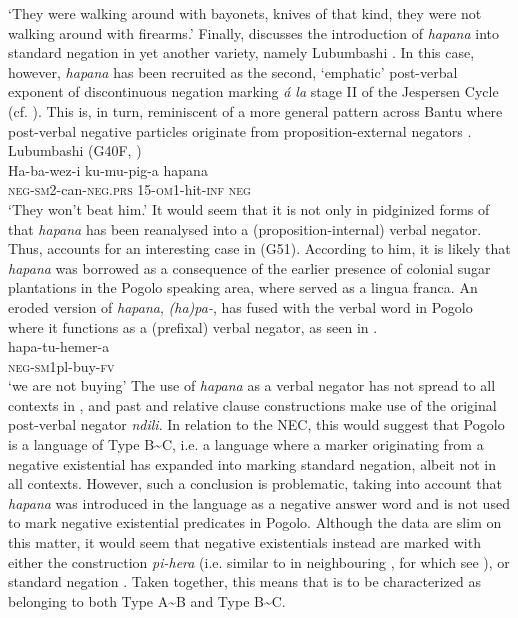 \documentclass[output=paper]{langsci/langscibook}
\begin{document}
\glt 	`They were walking around with bayonets, knives of that kind, they were not walking around with firearms.'
\z
%
Finally, \citet{Schicho1992} discusses the introduction of \textit{hapana}
into standard negation in yet another  variety, namely
Lubumbashi . In this case,
however, \textit{hapana} has been recruited as the second, `emphatic'
post-verbal exponent of discontinuous negation marking \textit{\'a la}
stage II of the Jespersen Cycle (cf. \citealt{Auwera2009}). This is, in
turn, reminiscent of a more general pattern across Bantu where post-verbal
negative particles originate from pro\-po\-si\-tion-ex\-ter\-nal negators
\parencite[see][]{DevosAuwera2013}.
%
\ea\label{ex:lubumbashi-beat}
Lubumbashi  (G40F, \citealt[84]{Schicho1992})\\
\gll Ha-ba-wez-i ku-mu-pig-a hapana\\
	\textsc{neg}-\textsc{sm}2-can-\textsc{neg.prs} 15-\textsc{om}1-hit-\textsc{inf} \textsc{neg}\\
\glt 	`They won't beat him.'
\z
%
It would seem that it is not only in pidginized forms of  that
\textit{hapana} has been reanalysed into a (proposition-internal) verbal
negator. Thus, \citet{Nurse2007} accounts for an interesting case in
 (G51). According to him, it is likely that \textit{hapana} was
borrowed as a consequence of the earlier presence of colonial sugar
plantations in the Pogolo speaking area, where  served as a lingua
franca. An eroded version of \textit{hapana}, \textit{(ha)pa-}, has fused
with the verbal word in Pogolo where it functions as a (prefixal) verbal
negator, as seen in .
%
\ea\label{ex:pogolo-buy}
\\
\gll hapa-tu-hemer-a\\
	\textsc{neg-sm}1pl-buy-\textsc{fv}\\
\glt 	`we are not buying'
\z
%
The use of \textit{hapana} as a verbal negator has not spread to all
contexts in , and past and relative clause constructions make use of the original post-verbal negator \textit{ndili}. In relation to the NEC, this would suggest that Pogolo is a language of Type B{\textasciitilde}C, i.e. a language where a marker originating from a negative existential has expanded into marking standard negation, albeit not in all contexts. However, such a conclusion is problematic, taking into account that \textit{hapana} was introduced in the language as a negative answer word and is not used to mark negative existential predicates in Pogolo. Although the data are slim on this matter, it would seem that negative existentials instead are marked with either the construction \textit{pi-hera} (i.e. similar to in neighbouring , for which see ), or standard negation \citep{Hendle1907}. Taken together, this means that  is to be characterized as belonging to both Type A{\textasciitilde}B and Type B{\textasciitilde}C.
\end{document}
